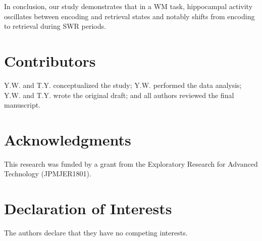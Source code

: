 \documentclass[final,3p,times,twocolumn]{elsarticle}
\begin{document}
In conclusion, our study demonstrates that in a WM task, hippocampal activity oscillates between encoding and retrieval states and notably shifts from encoding to retrieval during SWR periods.

\label{sec:discussion}





% 

% 





\section*{Contributors}
Y.W. and T.Y. conceptualized the study; Y.W. performed the data analysis; Y.W. and T.Y. wrote the original draft; and all authors reviewed the final manuscript.
\label{contributors}

\section*{Acknowledgments}
This research was funded by a grant from the Exploratory Research for Advanced Technology (JPMJER1801).
\label{acknowledgments}

\section*{Declaration of Interests}
The authors declare that they have no competing interests.
\label{declaration of interests}

\end{document}
